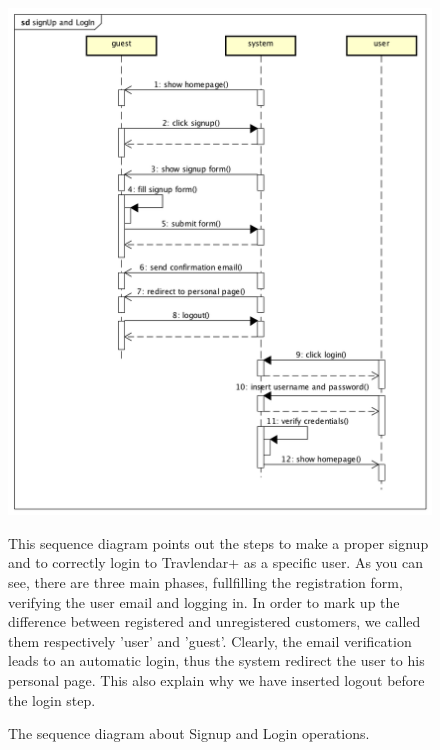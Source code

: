 \begin{figure}
	\centering
	\includegraphics[width=0.7\linewidth]{sequencediagrams/signup-logIn}
	\caption{The sequence diagram about Signup and Login operations.}
	\label{fig:signup-login}
	\begin{center}
		This sequence diagram points out the steps to make a proper signup and to correctly login to Travlendar+ as a specific user. As you can see, there are three main phases, fullfilling the registration form, verifying the user email and logging in. 
		In order to mark up the difference between  registered and  unregistered customers, we called them respectively 'user' and 'guest'. 
		Clearly, the email verification leads to an automatic login, thus the system redirect the user to his personal page. This also explain why we have inserted logout before the login step. 
	\end{center}
\end{figure}


